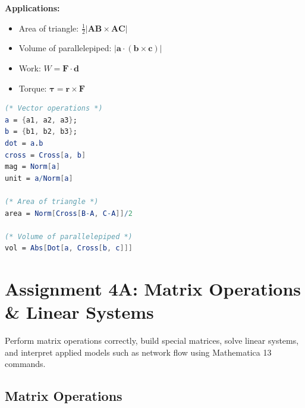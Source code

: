 \documentclass[12pt,a4paper]{article}
\begin{document}
\begin{formulabox}
    \textbf{Applications:}
    \begin{itemize}
        \item Area of triangle: \(\frac{1}{2}|\mathbf{AB} \times \mathbf{AC}|\)
        \item Volume of parallelepiped: \(|\mathbf{a} \cdot (\mathbf{b} \times \mathbf{c})|\)
        \item Work: \(W = \mathbf{F} \cdot \mathbf{d}\)
        \item Torque: \(\boldsymbol{\tau} = \mathbf{r} \times \mathbf{F}\)
    \end{itemize}
\end{formulabox}

\begin{mathematicabox}
    \begin{lstlisting}[language=Mathematica, basicstyle=\ttfamily\small]
(* Vector operations *)
a = {a1, a2, a3};
b = {b1, b2, b3};
dot = a.b
cross = Cross[a, b]
mag = Norm[a]
unit = a/Norm[a]

(* Area of triangle *)
area = Norm[Cross[B-A, C-A]]/2

(* Volume of parallelepiped *)
vol = Abs[Dot[a, Cross[b, c]]]
    \end{lstlisting}
\end{mathematicabox}

\section{Assignment 4A: Matrix Operations \& Linear Systems}

\begin{definitionbox}
    Perform matrix operations correctly, build special matrices, solve linear systems,
    and interpret applied models such as network flow using Mathematica 13 commands.
\end{definitionbox}

\subsection{Matrix Operations}
\end{document}
